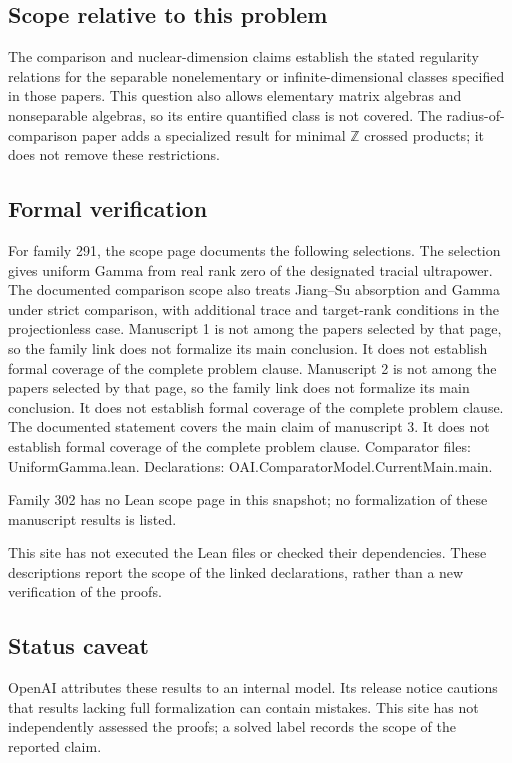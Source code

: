 \documentclass[11pt]{article}
\begin{document}
\subsection{Scope relative to this problem}
The comparison and nuclear-dimension claims establish the stated regularity relations for the separable nonelementary or infinite-dimensional classes specified in those papers. This question also allows elementary matrix algebras and nonseparable algebras, so its entire quantified class is not covered. The radius-of-comparison paper adds a specialized result for minimal $\mathbb Z$ crossed products; it does not remove these restrictions.

\subsection{Formal verification}
For family 291, the scope page documents the following selections. The selection gives uniform Gamma from real rank zero of the designated tracial ultrapower. The documented comparison scope also treats Jiang--Su absorption and Gamma under strict comparison, with additional trace and target-rank conditions in the projectionless case. Manuscript 1 is not among the papers selected by that page, so the family link does not formalize its main conclusion. It does not establish formal coverage of the complete problem clause. Manuscript 2 is not among the papers selected by that page, so the family link does not formalize its main conclusion. It does not establish formal coverage of the complete problem clause. The documented statement covers the main claim of manuscript 3. It does not establish formal coverage of the complete problem clause. Comparator files: UniformGamma.lean. Declarations: OAI.ComparatorModel.CurrentMain.main.

Family 302 has no Lean scope page in this snapshot; no formalization of these manuscript results is listed.

This site has not executed the Lean files or checked their dependencies. These descriptions report the scope of the linked declarations, rather than a new verification of the proofs.

\subsection{Status caveat}
OpenAI attributes these results to an internal model. Its release notice cautions that results lacking full formalization can contain mistakes. This site has not independently assessed the proofs; a solved label records the scope of the reported claim.
\end{document}
